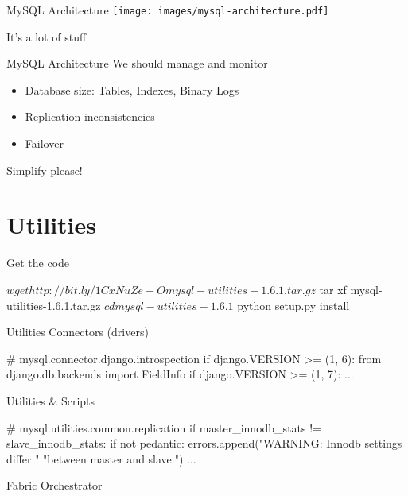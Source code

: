 \documentclass{beamer}[10]
\begin{document}
\begin{pyframe}{MySQL Architecture}
\texttt{[image: images/mysql-architecture.pdf]}
{\large
    \begin{center}
    It's a lot of stuff
    \end{center}
}
\end{pyframe}


\begin{pyframe}{MySQL Architecture}
We should manage and monitor
    \begin{itemize}
    \item Database size: Tables, Indexes, Binary Logs
    \item Replication inconsistencies
    \item Failover
    \end{itemize}
Simplify please!
\end{pyframe}



\section{Utilities}
\begin{pyframe}{Get the code}
    \begin{bashcode}
    $ wget http://bit.ly/1CxNuZe -O mysql-utilities-1.6.1.tar.gz
    $ tar xf mysql-utilities-1.6.1.tar.gz
    $ cd mysql-utilities-1.6.1
    $ python setup.py install
    \end{bashcode}

\end{pyframe}


\begin{pyframe}{Utilities}
Connectors (drivers)
\begin{pycode}
    # mysql.connector.django.introspection
    if django.VERSION >= (1, 6):
        from django.db.backends import FieldInfo
        if django.VERSION >= (1, 7):
            ...
\end{pycode}
Utilities \& Scripts
\begin{pycode}
    # mysql.utilities.common.replication
    if master_innodb_stats != slave_innodb_stats:
        if not pedantic:
            errors.append("WARNING: Innodb settings differ "
                          "between master and slave.")
    ...
\end{pycode}
Fabric Orchestrator
\end{pyframe}
\end{document}
